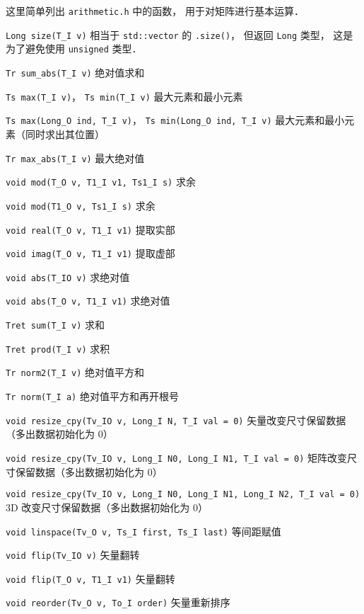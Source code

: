 
\begin{issues}
\issueDraft
\end{issues}


这里简单列出 \verb|arithmetic.h| 中的函数， 用于对矩阵进行基本运算．

\verb|Long size(T_I v)| 相当于 \verb|std::vector| 的 \verb|.size()|， 但返回 \verb|Long| 类型， 这是为了避免使用 \verb|unsigned| 类型．

\verb|Tr sum_abs(T_I v)| 绝对值求和

\verb|Ts max(T_I v)|， \verb|Ts min(T_I v)| 最大元素和最小元素

\verb|Ts max(Long_O ind, T_I v)|， \verb|Ts min(Long_O ind, T_I v)| 最大元素和最小元素（同时求出其位置）

\verb|Tr max_abs(T_I v)| 最大绝对值

\verb|void mod(T_O v, T1_I v1, Ts1_I s)| 求余

\verb|void mod(T1_O v, Ts1_I s)| 求余

\verb|void real(T_O v, T1_I v1)| 提取实部

\verb|void imag(T_O v, T1_I v1)| 提取虚部

\verb|void abs(T_IO v)| 求绝对值

\verb|void abs(T_O v, T1_I v1)| 求绝对值

\verb|Tret sum(T_I v)| 求和

\verb|Tret prod(T_I v)| 求积

\verb|Tr norm2(T_I v)| 绝对值平方和

\verb|Tr norm(T_I a)| 绝对值平方和再开根号

\verb|void resize_cpy(Tv_IO v, Long_I N, T_I val = 0)| 矢量改变尺寸保留数据（多出数据初始化为 0）

\verb|void resize_cpy(Tv_IO v, Long_I N0, Long_I N1, T_I val = 0)| 矩阵改变尺寸保留数据（多出数据初始化为 0）

\verb|void resize_cpy(Tv_IO v, Long_I N0, Long_I N1, Long_I N2, T_I val = 0)| 3D 改变尺寸保留数据（多出数据初始化为 0）

\verb|void linspace(Tv_O v, Ts_I first, Ts_I last)| 等间距赋值

\verb|void flip(Tv_IO v)| 矢量翻转

\verb|void flip(T_O v, T1_I v1)| 矢量翻转

\verb|void reorder(Tv_O v, To_I order)| 矢量重新排序

